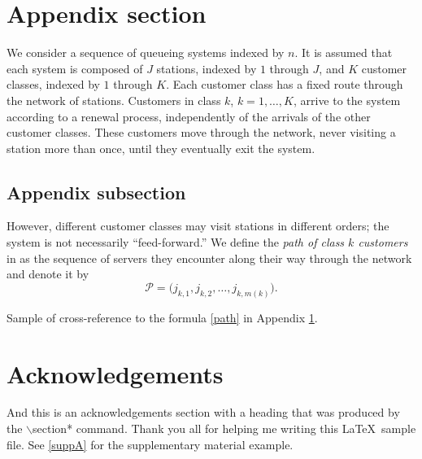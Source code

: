 \documentclass[dvips,aoas,preprint]{imsart}
\numberwithin{equation}{section}
\theoremstyle{plain}
\begin{document}
\appendix

\section{Appendix section}\label{app}

We consider a sequence of queueing systems
indexed by $n$.  It is assumed that each system
is composed of $J$ stations, indexed by $1$
through $J$, and $K$ customer classes, indexed
by $1$ through $K$.  Each customer class
has a fixed route through the network of
stations.  Customers in class
$k$, $k=1,\ldots,K$, arrive to the
system according to a
renewal process, independently of the arrivals
of the other customer classes.  These customers
move through the network, never visiting a station
more than once, until they eventually exit
the system.

\subsection{Appendix subsection}

However, different customer classes may visit
stations in different orders; the system
is not necessarily ``feed-forward.''
We define the {\em path of class $k$ customers} in
as the sequence of servers
they encounter along their way through the network
and denote it by
\begin{equation}
\mathcal{P}=\bigl(j_{k,1},j_{k,2},\dots,j_{k,m(k)}\bigr). \label{path}
\end{equation}

Sample of cross-reference to the formula \ref{path} in Appendix \ref{app}.

\section*{Acknowledgements}
And this is an acknowledgements section with a heading that was produced by the
$\backslash$section* command. Thank you all for helping me writing this
\LaTeX\ sample file. See \ref{suppA} for the supplementary material example.

\begin{supplement}
\label{suppA}
\end{supplement}
\end{document}
